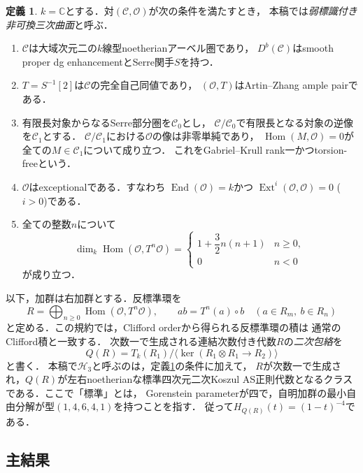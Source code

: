 \documentclass[11pt,a4paper]{ltjsarticle}
\theoremstyle{definition}
\newtheorem{definition}[theorem]{定義}
\begin{document}
\begin{definition}\label{def:weak-cubic}
$k=\mathbb C$とする．対$(\mathcal C,\mathcal O)$が次の条件を満たすとき，
本稿では\emph{弱標識付き非可換三次曲面}と呼ぶ．
\begin{enumerate}[label=(\arabic*)]
\item $\mathcal C$は大域次元二の$k$線型noetherianアーベル圏であり，
$D^b(\mathcal C)$はsmooth proper dg enhancementとSerre関手$S$を持つ．
\item $T=S^{-1}[2]$は$\mathcal C$の完全自己同値であり，
$(\mathcal O,T)$はArtin--Zhang ample pairである．
\item 有限長対象からなるSerre部分圏を$\mathcal C_0$とし，
$\mathcal C/\mathcal C_0$で有限長となる対象の逆像を$\mathcal C_1$とする．
$\mathcal C/\mathcal C_1$における$\mathcal O$の像は非零単純であり，
$\operatorname{Hom}(M,\mathcal O)=0$が全ての$M\in\mathcal C_1$について成り立つ．
これをGabriel--Krull rank一かつtorsion-freeという．
\item $\mathcal O$はexceptionalである．すなわち
$\operatorname{End}(\mathcal O)=k$かつ
$\operatorname{Ext}^{i}(\mathcal O,\mathcal O)=0$ ($i>0$)である．
\item 全ての整数$n$について
\[
 \dim_k\operatorname{Hom}(\mathcal O,T^n\mathcal O)
 =\begin{cases}
 1+\dfrac32n(n+1)&n\ge0,\\
 0&n<0
 \end{cases}
\]
が成り立つ．
\end{enumerate}
\end{definition}

以下，加群は右加群とする．反標準環を
\begin{equation}
 R=\bigoplus_{n\ge0}\operatorname{Hom}(\mathcal O,T^n\mathcal O),
 \qquad
 ab=T^n(a)\circ b\quad(a\in R_m,\ b\in R_n)
 \label{eq:orbit-product}
\end{equation}
と定める．この規約では，Clifford orderから得られる反標準環の積は
通常のClifford積と一致する．
次数一で生成される連結次数付き代数$R$の\emph{二次包絡}を
\[
 Q(R)=T_k(R_1)\Big/\Big\langle
 \ker(R_1\otimes R_1\longrightarrow R_2)\Big\rangle
\]
と書く．
本稿で$\mathcal H_3$と呼ぶのは，定義\ref{def:weak-cubic}の条件に加えて，
$R$が次数一で生成され，$Q(R)$が左右noetherianな標準四次元二次Koszul
AS正則代数となるクラスである．ここで「標準」とは，
Gorenstein parameterが四で，自明加群の最小自由分解が型$(1,4,6,4,1)$を持つことを指す．
従って$H_{Q(R)}(t)=(1-t)^{-4}$である．

\subsection{主結果}
\end{document}
